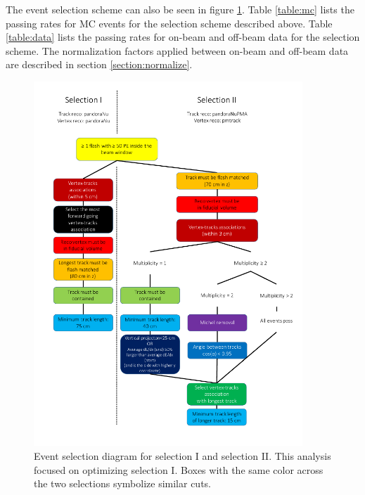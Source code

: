 The event selection scheme can also be seen in figure \ref{fig:selection}. Table \ref{table:mc} lists the passing rates for MC events for the selection scheme described above. Table \ref{table:data} lists the passing rates for on-beam and off-beam data for the selection scheme. The normalization factors applied between on-beam and off-beam data are described in section \ref{section:normalize}.
\begin{figure}[htp!]
\includegraphics[width=0.9\textwidth]{figs/selection.png}
\caption{Event selection diagram for selection I and selection II. This analysis focused on optimizing selection I. Boxes with the same color across the two selections symbolize similar cuts.}
\label{fig:selection}
\end{figure}


